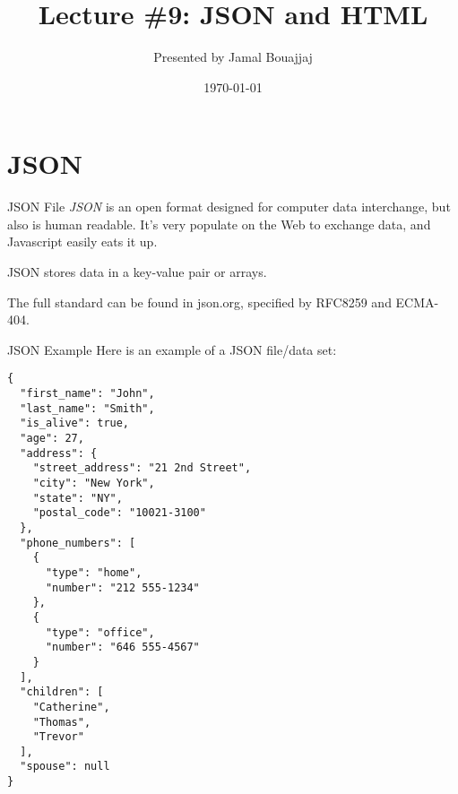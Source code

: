 %
%



\title{Lecture \#9: JSON and HTML}
\date{\today}
\author{Presented by Jamal Bouajjaj}

\makeatletter
{}%
\makeatother



\maketitle

\section{JSON}

\begin{frame}[containsverbatim]{JSON File}
  \textit{JSON} is an open format designed for computer data interchange, but also is human readable. It's very populate on the Web to exchange data, and Javascript easily eats it up.\pause

  JSON stores data in a key-value pair or arrays.

  The full standard can be found in json.org, specified by RFC8259 and ECMA-404.
\end{frame}

\begin{frame}[containsverbatim]{JSON Example}
  Here is an example of a JSON file/data set:
\begin{verbatim}
{
  "first_name": "John",
  "last_name": "Smith",
  "is_alive": true,
  "age": 27,
  "address": {
    "street_address": "21 2nd Street",
    "city": "New York",
    "state": "NY",
    "postal_code": "10021-3100"
  },
  "phone_numbers": [
    {
      "type": "home",
      "number": "212 555-1234"
    },
    {
      "type": "office",
      "number": "646 555-4567"
    }
  ],
  "children": [
    "Catherine",
    "Thomas",
    "Trevor"
  ],
  "spouse": null
}
\end{verbatim}
\end{frame}

